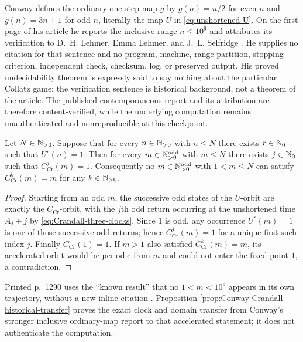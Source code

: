 Conway defines the ordinary one-step map $g$ by $g(n)=n/2$ for even $n$ and
$g(n)=3n+1$ for odd $n$, literally the map $U$ in
\eqref{eq:unshortened-U}.  On the first page of his article he reports the
inclusive range $n\leq10^9$ and attributes its verification to D.~H. Lehmer,
Emma Lehmer, and J.~L. Selfridge \cite[p.~219]{Conway1972}.  He supplies no
citation for that sentence and no program, machine, range partition,
stopping criterion, independent check, checksum, log, or preserved output.
His proved undecidability theorem is expressly said to say nothing about the
particular Collatz game; the verification sentence is historical background,
not a theorem of the article.  The published contemporaneous report and its
attribution are therefore content-verified, while the underlying computation
remains unauthenticated and nonreproducible at this checkpoint.

\begin{proposition}
\label{prop:Conway-Crandall-historical-transfer}
Let $N\in\mathbb{N}_{>0}$.  Suppose that for every $n\in\mathbb{N}_{>0}$ with $n\leq N$ there
exists $r\in\mathbb{N}_{0}$ such that $U^r(n)=1$.  Then for every
$m\in\mathbb{N}_{>0}^{\mathrm{odd}}$ with $m\leq N$ there exists $j\in\mathbb{N}_{0}$ such that
$C_{\mathrm{Cr}}^j(m)=1$.  Consequently no $m\in\mathbb{N}_{>0}^{\mathrm{odd}}$ with
$1<m\leq N$ can satisfy $C_{\mathrm{Cr}}^k(m)=m$ for any $k\in\mathbb{N}_{>0}$.
\end{proposition}

\begin{proof}
Starting from an odd $m$, the successive odd states of the $U$-orbit are
exactly the $C_{\mathrm{Cr}}$-orbit, with the $j$th odd return occurring at
the unshortened time $A_j+j$ by \eqref{eq:Crandall-three-clocks}.  Since $1$
is odd, any occurrence $U^r(m)=1$ is one of those successive odd returns;
hence $C_{\mathrm{Cr}}^j(m)=1$ for a unique first such index $j$.  Finally
$C_{\mathrm{Cr}}(1)=1$.  If $m>1$ also satisfied
$C_{\mathrm{Cr}}^k(m)=m$, its accelerated orbit would be periodic from $m$
and could not enter the fixed point $1$, a contradiction.
\end{proof}

Printed p.~1290 uses the ``known result'' that no $1<m<10^9$ appears in
its own trajectory, without a new inline citation
\cite[p.~1290]{Crandall1978}.  Proposition
\ref{prop:Conway-Crandall-historical-transfer} proves the exact clock and
domain transfer from Conway's stronger inclusive ordinary-map report to that
accelerated statement; it does not authenticate the computation.

